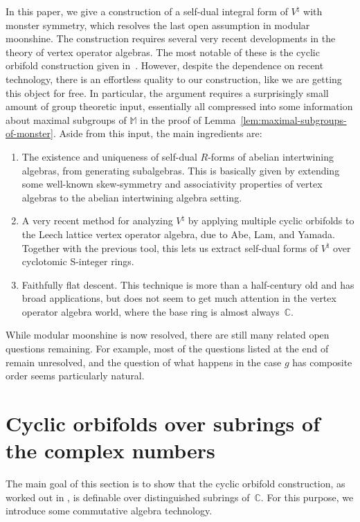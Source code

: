 \documentclass[pdftex]{sigma}
\newcommand{\bC}{\mathbb{C}}
\newcommand{\bM}{\mathbb{M}}
\theoremstyle{definition}
\begin{document}
In this paper, we give a construction of a self-dual integral form of $V^\natural$ with monster symmetry, which resolves the last open assumption in modular moonshine. The construction requires several very recent developments in the theory of vertex operator algebras. The most notable of these is the cyclic orbifold construction given in~\cite{vEMS}. However, despite the dependence on recent technology, there is an effortless quality to our construction, like we are getting this object for free. In particular, the argument requires a surprisingly small amount of group theoretic input, essentially all compressed into some information about maximal subgroups of $\bM$ in the proof of Lemma~\ref{lem:maximal-subgroups-of-monster}. Aside from this input, the main ingredients are:
\begin{enumerate}\itemsep=0pt
\item The existence and uniqueness of self-dual $R$-forms of abelian intertwining algebras, from generating subalgebras. This is basically given by extending some well-known skew-symmetry and associativity properties of vertex algebras to the abelian intertwining algebra setting.
\item A very recent method for analyzing $V^\natural$ by applying multiple cyclic orbifolds to the Leech lattice vertex operator algebra, due to Abe, Lam, and Yamada. Together with the previous tool, this lets us extract self-dual forms of $V^\natural$ over cyclotomic S-integer rings.
\item Faithfully flat descent. This technique is more than a half-century old and has broad applications, but does not seem to get much attention in the vertex operator algebra world, where the base ring is almost always~$\bC$.
\end{enumerate}

While modular moonshine is now resolved, there are still many related open questions remaining. For example, most of the questions listed at the end of~\cite{BR96} remain unresolved, and the question of what happens in the case $g$ has composite order seems particularly natural.

\section{Cyclic orbifolds over subrings of the complex numbers}

The main goal of this section is to show that the cyclic orbifold construction, as worked out in \cite{vEMS}, is definable over distinguished subrings of~$\bC$. For this purpose, we introduce some commutative algebra technology.
\end{document}
